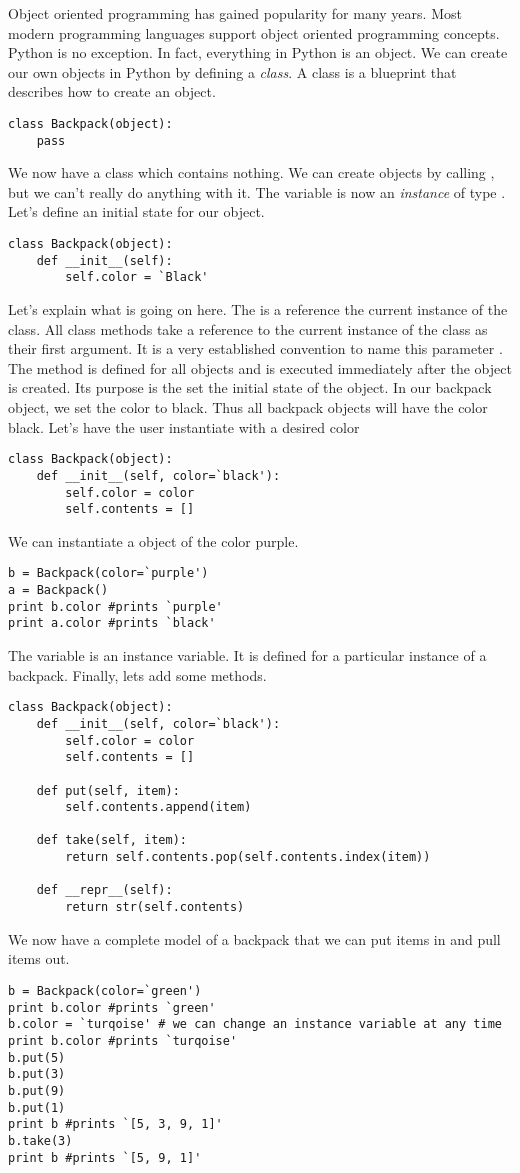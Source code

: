 Object oriented programming has gained popularity for many years.
Most modern programming languages support object oriented programming concepts.
Python is no exception.
In fact, everything in Python is an object.
We can create our own objects in Python by defining a \emph{class}.
A class is a blueprint that describes how to create an object.
\begin{lstlisting}
class Backpack(object):
    pass
\end{lstlisting}
We now have a class  which contains nothing.
We can create  objects by calling , but we can't really do anything with it.
The variable  is now an \emph{instance} of type .
Let's define an initial state for our object.
\begin{lstlisting}
class Backpack(object):
    def __init__(self):
        self.color = `Black'
\end{lstlisting}
Let's explain what is going on here.
The  is a reference the current instance of the class.
All class methods take a reference to the current instance of the class as their first argument.
It is a very established convention to name this parameter .
The  method is defined for all objects and is executed immediately after the object is created.
Its purpose is the set the initial state of the object.
In our backpack object, we set the color to black.
Thus all backpack objects will have the color black.
Let's have the user instantiate with a desired color
\begin{lstlisting}
class Backpack(object):
    def __init__(self, color=`black'):
        self.color = color
        self.contents = []
\end{lstlisting}
We can instantiate a  object of the color purple.
\begin{lstlisting}
b = Backpack(color=`purple')
a = Backpack()
print b.color #prints `purple'
print a.color #prints `black'
\end{lstlisting}
The variable  is an instance variable.
It is defined for a particular instance of a backpack.
Finally, lets add some methods.
\begin{lstlisting}
class Backpack(object):
    def __init__(self, color=`black'):
        self.color = color
        self.contents = []
        
    def put(self, item):
        self.contents.append(item)
        
    def take(self, item):
        return self.contents.pop(self.contents.index(item))
        
    def __repr__(self):
        return str(self.contents)
\end{lstlisting}
We now have a complete model of a backpack that we can put items in and pull items out.
\begin{lstlisting}
b = Backpack(color=`green')
print b.color #prints `green'
b.color = `turqoise' # we can change an instance variable at any time
print b.color #prints `turqoise'
b.put(5)
b.put(3)
b.put(9)
b.put(1)
print b #prints `[5, 3, 9, 1]'
b.take(3)
print b #prints `[5, 9, 1]'
\end{lstlisting}

